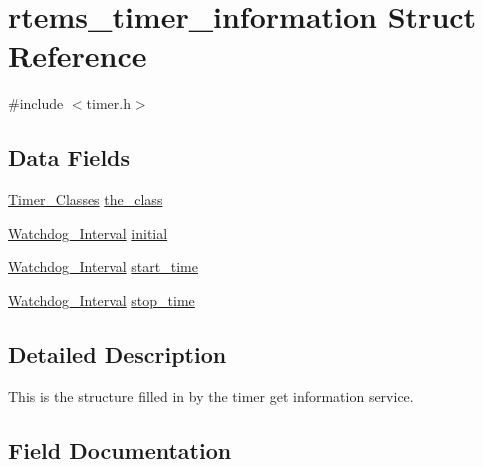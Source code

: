\hypertarget{structrtems__timer__information}{}\section{rtems\+\_\+timer\+\_\+information Struct Reference}
\label{structrtems__timer__information}


{\ttfamily \#include $<$timer.\+h$>$}

\subsection*{Data Fields}
\begin{DoxyCompactItemize}
\item 
\mbox{\hyperlink{group__ClassicTimer_gaca88ac1e833f63ec72d38e07677f2f27}{Timer\+\_\+\+Classes}} \mbox{\hyperlink{structrtems__timer__information_a9712f6b86dd6e8808110e41d259bb8bb}{the\+\_\+class}}
\item 
\mbox{\hyperlink{group__RTEMSScoreWatchdog_gaa1834fd7531ca9bb5c4ca6fd990388d5}{Watchdog\+\_\+\+Interval}} \mbox{\hyperlink{structrtems__timer__information_aeba38a041e4482bd4701515003bdf69e}{initial}}
\item 
\mbox{\hyperlink{group__RTEMSScoreWatchdog_gaa1834fd7531ca9bb5c4ca6fd990388d5}{Watchdog\+\_\+\+Interval}} \mbox{\hyperlink{structrtems__timer__information_af88f83d48629973ba59a5f0578b80831}{start\+\_\+time}}
\item 
\mbox{\hyperlink{group__RTEMSScoreWatchdog_gaa1834fd7531ca9bb5c4ca6fd990388d5}{Watchdog\+\_\+\+Interval}} \mbox{\hyperlink{structrtems__timer__information_a4dffa761b2a429b497d83e9f0d60b46c}{stop\+\_\+time}}
\end{DoxyCompactItemize}


\subsection{Detailed Description}
This is the structure filled in by the timer get information service. 

\subsection{Field Documentation}
\mbox{\label{structrtems__timer__information_aeba38a041e4482bd4701515003bdf69e}} 
